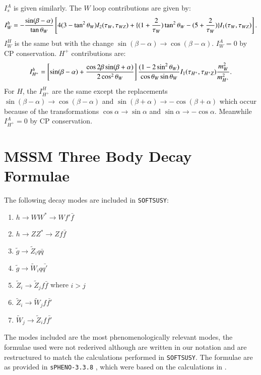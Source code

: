 \documentclass[final,3p,times]{elsarticle}
\begin{document}
$I_{s}^A$ is given similarly.
The $W$ loop contributions are given by:
\begin{equation}
I_{W}^h = -{\sin(\beta - \alpha) \over \tan\theta_W}\left[4(3-\tan^2 \theta_W)I_{2} (\tau_W, \tau_{WZ}) + \{(1+{2 \over \tau_W})\tan^2 \theta_W - (5 + {2 \over \tau_W})\}I_{1}(\tau_W, \tau_{WZ})\right].
\end{equation}
$I_{W}^H$ is the same but with the change $\sin(\beta - \alpha) \rightarrow \cos(\beta - \alpha)$. $I_{W}^A = 0$ by CP conservation.
$H^+$ contributions are:
\begin{equation}
I_{H^+}^h = \left[\sin(\beta - \alpha) + {\cos 2\beta \sin(\beta+\alpha) \over 2 \cos^2 \theta_W}\right]{(1-2\sin^2 \theta_W) \over \cos\theta_W \sin\theta_W} I_{1}(\tau_{H^+},\tau_{H^+ Z}){m_{W}^2 \over m_{H^+}^2}.
\end{equation}
For $H$, the $I_{H^+}^H$ are the same except the replacements $\sin(\beta - \alpha) \rightarrow \cos(\beta - \alpha)$ and $ \sin(\beta+\alpha) \rightarrow -\cos(\beta+\alpha)$ which occur because of the transformations $\cos\alpha \rightarrow \sin\alpha$ and $ \sin\alpha \rightarrow -\cos\alpha$. Meanwhile $I_{H^+}^A = 0$ by CP conservation.


\section{MSSM Three Body Decay Formulae} \label{appendix:MSSM3body}
The following decay modes are included in {\tt {\tt SOFTSUSY}}:
\begin{enumerate}
\item $h \rightarrow WW^* \rightarrow W f' \bar{f}$ 
\item $h \rightarrow ZZ^* \rightarrow Z f \bar{f}$ 
\item $\tilde{g} \rightarrow \tilde{Z}_i q \bar{q}$
\item $\tilde{g} \rightarrow \tilde{W}_i q \bar{q'}$
\item $\tilde{Z}_{i} \rightarrow \tilde{Z}_j f \bar{f}$ where $i>j$
\item $\tilde{Z}_{i} \rightarrow \tilde{W}_j f \bar{f'}$
\item $\tilde{W}_{j} \rightarrow \tilde{Z}_i f \bar{f'}$
\end{enumerate}
The modes included are the most phenomenologically relevant modes, the formulae used were not rederived although are written in our notation and are restructured to match the calculations performed in {\tt SOFTSUSY}. The formulae are as provided in {\tt sPHENO-3.3.8} \cite{Porod:2003um,Porod:2011}, which were based on the calculations in \cite{Baer:1998, Djouadi:2001ma}.
\end{document}
